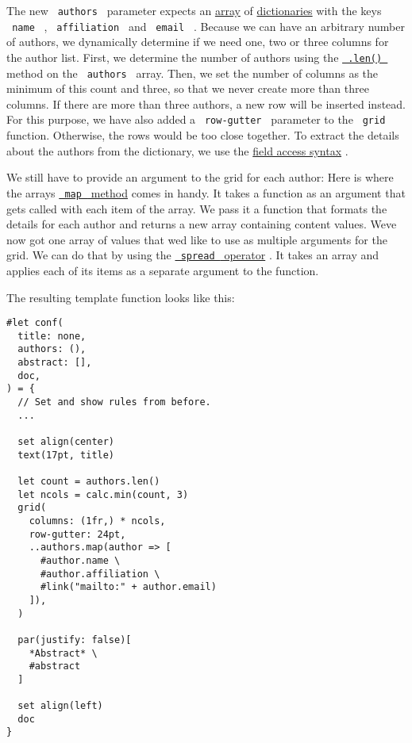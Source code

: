 The new \texttt{\ authors\ } parameter expects an
\href{/docs/reference/foundations/array/}{array} of
\href{/docs/reference/foundations/dictionary/}{dictionaries} with the
keys \texttt{\ name\ } , \texttt{\ affiliation\ } and \texttt{\ email\ }
. Because we can have an arbitrary number of authors, we dynamically
determine if we need one, two or three columns for the author list.
First, we determine the number of authors using the
\href{/docs/reference/foundations/array/\#definitions-len}{\texttt{\ .len()\ }}
method on the \texttt{\ authors\ } array. Then, we set the number of
columns as the minimum of this count and three, so that we never create
more than three columns. If there are more than three authors, a new row
will be inserted instead. For this purpose, we have also added a
\texttt{\ row-gutter\ } parameter to the \texttt{\ grid\ } function.
Otherwise, the rows would be too close together. To extract the details
about the authors from the dictionary, we use the
\href{/docs/reference/scripting/\#fields}{field access syntax} .

We still have to provide an argument to the grid for each author: Here
is where the array\textquotesingle s
\href{/docs/reference/foundations/array/\#definitions-map}{\texttt{\ map\ }
method} comes in handy. It takes a function as an argument that gets
called with each item of the array. We pass it a function that formats
the details for each author and returns a new array containing content
values. We\textquotesingle ve now got one array of values that
we\textquotesingle d like to use as multiple arguments for the grid. We
can do that by using the
\href{/docs/reference/foundations/arguments/}{\texttt{\ spread\ }
operator} . It takes an array and applies each of its items as a
separate argument to the function.

The resulting template function looks like this:

\begin{verbatim}
#let conf(
  title: none,
  authors: (),
  abstract: [],
  doc,
) = {
  // Set and show rules from before.
  ...

  set align(center)
  text(17pt, title)

  let count = authors.len()
  let ncols = calc.min(count, 3)
  grid(
    columns: (1fr,) * ncols,
    row-gutter: 24pt,
    ..authors.map(author => [
      #author.name \
      #author.affiliation \
      #link("mailto:" + author.email)
    ]),
  )

  par(justify: false)[
    *Abstract* \
    #abstract
  ]

  set align(left)
  doc
}
\end{verbatim}

